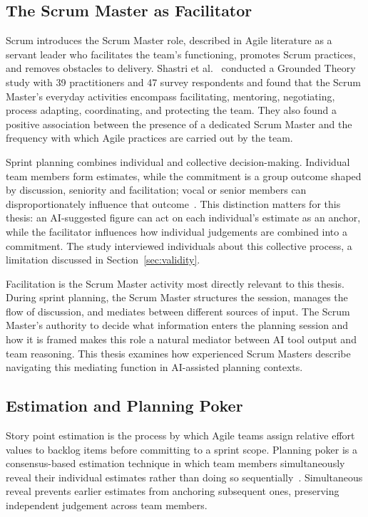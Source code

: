 \documentclass[a4paper,twoside]{bth}
\begin{document}
\subsection{The Scrum Master as Facilitator}

Scrum introduces the Scrum Master role, described in Agile literature as a servant leader who facilitates the team's functioning, promotes Scrum practices, and removes obstacles to delivery. Shastri et al.~\cite{shastri2021spearheading} conducted a Grounded Theory study with 39 practitioners and 47 survey respondents and found that the Scrum Master's everyday activities encompass facilitating, mentoring, negotiating, process adapting, coordinating, and protecting the team. They also found a positive association between the presence of a dedicated Scrum Master and the frequency with which Agile practices are carried out by the team.

Sprint planning combines individual and collective decision-making. Individual team members form estimates, while the commitment is a group outcome shaped by discussion, seniority and facilitation; vocal or senior members can disproportionately influence that outcome~\cite{zacek2024improvements}. This distinction matters for this thesis: an AI-suggested figure can act on each individual's estimate as an anchor, while the facilitator influences how individual judgements are combined into a commitment. The study interviewed individuals about this collective process, a limitation discussed in Section~\ref{sec:validity}.

Facilitation is the Scrum Master activity most directly relevant to this thesis. During sprint planning, the Scrum Master structures the session, manages the flow of discussion, and mediates between different sources of input. The Scrum Master's authority to decide what information enters the planning session and how it is framed makes this role a natural mediator between AI tool output and team reasoning. This thesis examines how experienced Scrum Masters describe navigating this mediating function in AI-assisted planning contexts.

\subsection{Estimation and Planning Poker}

Story point estimation is the process by which Agile teams assign relative effort values to backlog items before committing to a sprint scope. Planning poker is a consensus-based estimation technique in which team members simultaneously reveal their individual estimates rather than doing so sequentially~\cite{molokken2007combining}. Simultaneous reveal prevents earlier estimates from anchoring subsequent ones, preserving independent judgement across team members.
\end{document}
